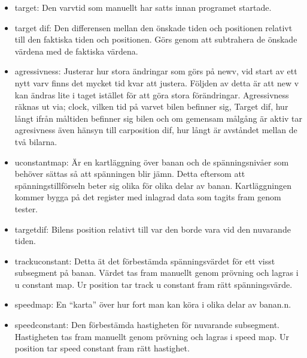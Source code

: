 \begin{itemize}
      \item target: Den varvtid som manuellt har satts innan programet startade.
      \item target dif: Den differensen mellan den önskade tiden och positionen relativt till den faktiska tiden och positionen. Görs genom att subtrahera de önskade värdena med de faktiska värdena.  
      \item agressivness: Justerar hur stora ändringar som görs på new\textunderscore v, vid start av ett nytt varv finns det mycket tid kvar att justera. Följden av detta är att new \textunderscore v kan ändras lite i taget istället för att göra stora förändringar. Agressivness räknas ut via; clock,  vilken tid på varvet bilen befinner sig, Target \textunderscore dif,  hur långt ifrån måltiden befinner sig bilen och om gemensam målgång är aktiv tar agresivness även hänsyn till car\textunderscore position \textunderscore dif,  hur långt är avståndet mellan de två bilarna. 
      \item u\textunderscore constant\textunderscore map: Är en kartläggning över banan och de spänningsnivåer som behöver sättas så att spänningen blir jämn. Detta eftersom att spänningstillförseln beter sig olika för olika delar av banan. Kartläggningen kommer bygga på det register med inlagrad data som tagits fram genom tester.
      \item target\textunderscore dif: Bilens position relativt till var den borde vara vid den nuvarande tiden.
      \item track\textunderscore u\textunderscore constant: Detta ät det förbestämda spänningsvärdet för ett visst subsegment på banan. Värdet tas fram manuellt genom prövning och lagras i u \textunderscore constant \textunderscore map. Ur position tar track \textunderscore u \textunderscore constant fram rätt spänningsvärde. 
      \item speed\textunderscore map: En ``karta'' över hur fort man kan köra i olika delar av banan.n.
      \item speed\textunderscore constant: Den förbestämda hastigheten för nuvarande subsegment. Hastigheten tas fram manuellt genom prövning och lagras i speed \textunderscore map. Ur position tar speed \textunderscore constant fram rätt hastighet. 


\end{itemize}
